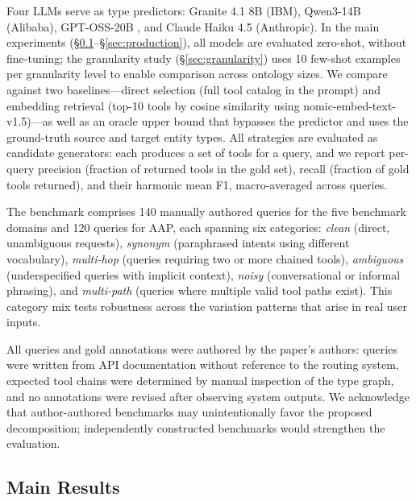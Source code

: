 \documentclass{article}
\begin{document}
Four LLMs serve as type predictors: Granite 4.1 8B (IBM), Qwen3-14B (Alibaba), GPT-OSS-20B \citep{openai2025gptoss}, and Claude Haiku 4.5 (Anthropic). In the main experiments (\S\ref{sec:main}--\S\ref{sec:production}), all models are evaluated zero-shot, without fine-tuning; the granularity study (\S\ref{sec:granularity}) uses 10 few-shot examples per granularity level to enable comparison across ontology sizes. We compare against two baselines---direct selection (full tool catalog in the prompt) and embedding retrieval (top-10 tools by cosine similarity using nomic-embed-text-v1.5)---as well as an oracle upper bound that bypasses the predictor and uses the ground-truth source and target entity types. All strategies are evaluated as candidate generators: each produces a set of tools for a query, and we report per-query precision (fraction of returned tools in the gold set), recall (fraction of gold tools returned), and their harmonic mean F1, macro-averaged across queries.

The benchmark comprises 140 manually authored queries for the five benchmark domains and 120 queries for AAP, each spanning six categories: \emph{clean} (direct, unambiguous requests), \emph{synonym} (paraphrased intents using different vocabulary), \emph{multi-hop} (queries requiring two or more chained tools), \emph{ambiguous} (underspecified queries with implicit context), \emph{noisy} (conversational or informal phrasing), and \emph{multi-path} (queries where multiple valid tool paths exist). This category mix tests robustness across the variation patterns that arise in real user inputs.

All queries and gold annotations were authored by the paper's authors: queries were written from API documentation without reference to the routing system, expected tool chains were determined by manual inspection of the type graph, and no annotations were revised after observing system outputs. We acknowledge that author-authored benchmarks may unintentionally favor the proposed decomposition; independently constructed benchmarks would strengthen the evaluation.

\subsection{Main Results}\label{sec:main}
\end{document}

